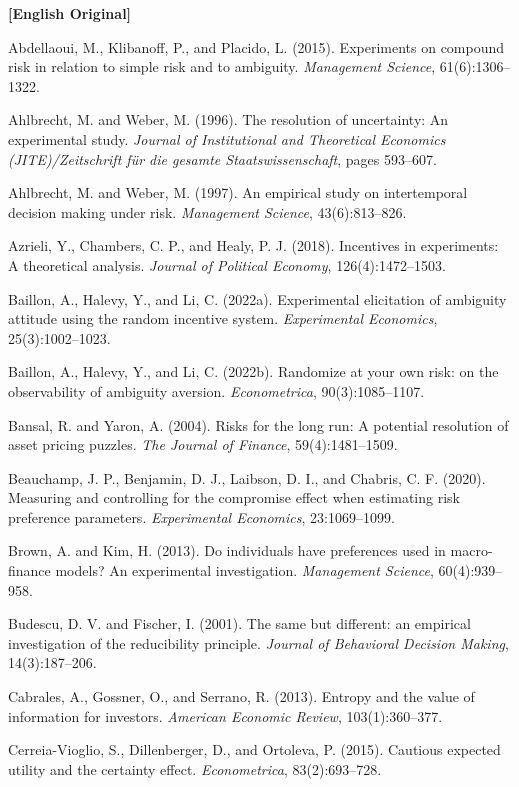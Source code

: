 \documentclass[12pt,a4paper]{ctexart}
\newenvironment{original}{%
  \par\medskip\noindent\textbf{[English Original]}\par\smallskip
  \color{black}\small
}{%
  \par\medskip
}
\theoremstyle{definition}
\theoremstyle{remark}
\begin{document}
\begin{original}
\small
Abdellaoui, M., Klibanoff, P., and Placido, L. (2015). Experiments on compound risk in relation to simple risk and to ambiguity. \textit{Management Science}, 61(6):1306--1322.

Ahlbrecht, M. and Weber, M. (1996). The resolution of uncertainty: An experimental study. \textit{Journal of Institutional and Theoretical Economics (JITE)/Zeitschrift f\"{u}r die gesamte Staatswissenschaft}, pages 593--607.

Ahlbrecht, M. and Weber, M. (1997). An empirical study on intertemporal decision making under risk. \textit{Management Science}, 43(6):813--826.

Azrieli, Y., Chambers, C. P., and Healy, P. J. (2018). Incentives in experiments: A theoretical analysis. \textit{Journal of Political Economy}, 126(4):1472--1503.

Baillon, A., Halevy, Y., and Li, C. (2022a). Experimental elicitation of ambiguity attitude using the random incentive system. \textit{Experimental Economics}, 25(3):1002--1023.

Baillon, A., Halevy, Y., and Li, C. (2022b). Randomize at your own risk: on the observability of ambiguity aversion. \textit{Econometrica}, 90(3):1085--1107.

Bansal, R. and Yaron, A. (2004). Risks for the long run: A potential resolution of asset pricing puzzles. \textit{The Journal of Finance}, 59(4):1481--1509.

Beauchamp, J. P., Benjamin, D. J., Laibson, D. I., and Chabris, C. F. (2020). Measuring and controlling for the compromise effect when estimating risk preference parameters. \textit{Experimental Economics}, 23:1069--1099.

Brown, A. and Kim, H. (2013). Do individuals have preferences used in macro-finance models? An experimental investigation. \textit{Management Science}, 60(4):939--958.

Budescu, D. V. and Fischer, I. (2001). The same but different: an empirical investigation of the reducibility principle. \textit{Journal of Behavioral Decision Making}, 14(3):187--206.

Cabrales, A., Gossner, O., and Serrano, R. (2013). Entropy and the value of information for investors. \textit{American Economic Review}, 103(1):360--377.

Cerreia-Vioglio, S., Dillenberger, D., and Ortoleva, P. (2015). Cautious expected utility and the certainty effect. \textit{Econometrica}, 83(2):693--728.


\end{original}
\end{document}
